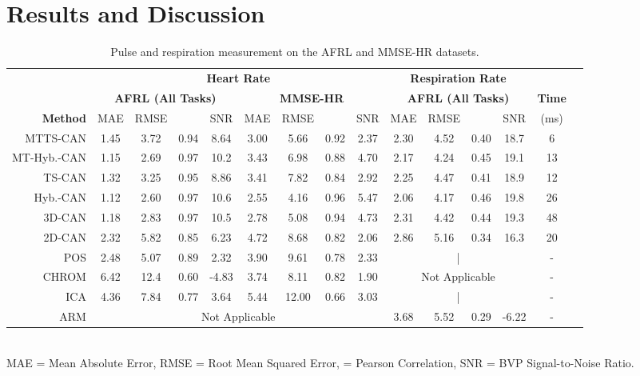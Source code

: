 \documentclass{article}
\begin{document}
\section{Results and Discussion}
\begin{table*}[t]
	\footnotesize
	\caption{Pulse and respiration measurement on the AFRL and MMSE-HR datasets.}
	\label{tab:AFRL_MMSE}
	\centering
	\setlength\tabcolsep{3pt} \begin{tabular}{r|cccc|cccc|cccc|cc}
	\toprule
		& \multicolumn{8}{c}{\textbf{Heart Rate}} & \multicolumn{4}{c}{\textbf{Respiration Rate}} \\
		& \multicolumn{4}{c}{\textbf{AFRL (All Tasks) }} &  \multicolumn{4}{c}{\textbf{MMSE-HR}}  & \multicolumn{4}{c}{\textbf{AFRL (All Tasks) }} & \textbf{Time}  \\
        \textbf{Method} & MAE & RMSE &  & SNR & MAE & RMSE &  & SNR & MAE & RMSE &  & SNR & (ms) & \\ \hline \hline
        MTTS-CAN & 1.45 &  3.72 & 0.94 & 8.64 & 3.00 & 5.66 & 0.92 & 2.37 & 2.30 & 4.52 & 0.40 & 18.7 & 6 \\
        MT-Hyb.-CAN & 1.15 & 2.69 & 0.97 & 10.2 & 3.43 & 6.98 & 0.88 & 4.70 & 2.17 & 4.24 & 0.45 & 19.1 & 13 \\ 
        TS-CAN & 1.32 &  3.25 & 0.95 & 8.86 & 3.41 & 7.82 & 0.84  & 2.92  & 2.25 & 4.47 & 0.41 & 18.9 & 12 \\
        Hyb.-CAN & 1.12 & 2.60 & 0.97 & 10.6 & 2.55 & 4.16 & 0.96 & 5.47  & 2.06 & 4.17 & 0.46 & 19.8 & 26 \\
        3D-CAN & 1.18 & 2.83 & 0.97 & 10.5 & 2.78 & 5.08 & 0.94 & 4.73 & 2.31 & 4.42 & 0.44 & 19.3 & 48  \\ \hdashline
        2D-CAN \citep{chen2018deepphys} & 2.32 & 5.82 & 0.85 & 6.23 & 4.72 & 8.68 &  0.82 & 2.06  & 2.86 & 5.16 & 0.34 & 16.3 & 20  \\
        POS \citep{wang2016algorithmic} & 2.48 & 5.07 & 0.89 & 2.32 & 3.90 & 9.61 & 0.78 & 2.33 & \multicolumn{4}{c|}{|} & - \\
        CHROM \citep{de2013robust} & 6.42 & 12.4  & 0.60  & -4.83 & 3.74 & 8.11 & 0.82 & 1.90 & \multicolumn{4}{c|}{Not Applicable} & -\\
        ICA \citep{poh2010advancements} & 4.36 & 7.84 & 0.77 & 3.64 & 5.44 & 12.00 & 0.66 & 3.03 &  \multicolumn{4}{c|}{|} & - \\ 
        ARM \citep{tarassenko2014non} & \multicolumn{8}{c}{\multirow{1}{*}{Not Applicable}}  & 3.68 & 5.52 & 0.29 & -6.22 & - \\
        \bottomrule 
   \end{tabular}
   \\
   \tiny
   MAE = Mean Absolute Error, RMSE = Root Mean Squared Error,  = Pearson Correlation, SNR = BVP Signal-to-Noise Ratio.
   \vspace{-0.4cm}
\end{table*}
\end{document}
